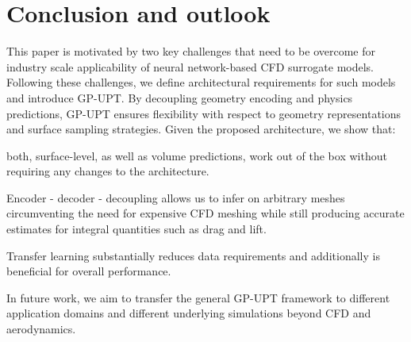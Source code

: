 \section{Conclusion and outlook}
\label{sec:conclusion}
This paper is motivated by two key challenges that need to be overcome for industry scale applicability of neural network-based \ac{CFD} surrogate models.
Following these challenges, we define architectural requirements for such models and introduce \ac{GP-UPT}.
By decoupling geometry encoding and physics predictions, \ac{GP-UPT} ensures flexibility with respect to geometry representations and surface sampling strategies.
Given the proposed architecture, we show that:
\begin{enumerate*}[label=(\arabic*)]
    \item both, surface-level, as well as volume predictions, work out of the box without requiring any changes to the architecture.
    \item Encoder - decoder - decoupling allows us to infer on arbitrary meshes circumventing the need for expensive \ac{CFD} meshing while still producing accurate estimates for integral quantities such as drag and lift.
    \item Transfer learning substantially reduces data requirements and additionally is beneficial for overall performance.
\end{enumerate*}
In future work, we aim to transfer the general \ac{GP-UPT} framework to different application domains and different underlying simulations beyond \ac{CFD} and aerodynamics. 
